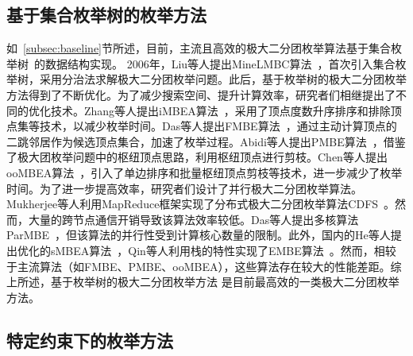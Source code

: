 

\subsection{基于集合枚举树的枚举方法}

如~\ref{subsec:baseline}节所述，目前，主流且高效的极大二分团枚举算法基于集合枚举树~\cite{SEtree92}的数据结构实现。
2006年，Liu等人提出MineLMBC算法~\cite{minel06}，首次引入集合枚举树，采用分治法求解极大二分团枚举问题。此后，基于枚举树的极大二分团枚举方法得到了不断优化。为了减少搜索空间、提升计算效率，研究者们相继提出了不同的优化技术。Zhang等人提出iMBEA算法~\cite{iMBEA14}，采用了顶点度数升序排序和排除顶点集等技术，以减少枚举时间。Das等人提出FMBE算法~\cite{parMBE19}，通过主动计算顶点的二跳邻居作为候选顶点集合，加速了枚举过程。Abidi等人提出PMBE算法~\cite{PMBE20}，借鉴了极大团枚举问题中的枢纽顶点思路，利用枢纽顶点进行剪枝。Chen等人提出ooMBEA算法~\cite{ooMBE22}，引入了单边排序和批量枢纽顶点剪枝等技术，进一步减少了枚举时间。为了进一步提高效率，研究者们设计了并行极大二分团枚举算法。Mukherjee等人利用MapReduce框架实现了分布式极大二分团枚举算法CDFS~\cite{mapreduceMBE16}。然而，大量的跨节点通信开销导致该算法效率较低。Das等人提出多核算法ParMBE~\cite{parMBE19}，但该算法的并行性受到计算核心数量的限制。此外，国内的He等人提出优化的sMBEA算法~\cite{MBEHe18,MBEchinese19}，Qin等人利用栈的特性实现了EMBE算法~\cite{MBEQin20}。然而，相较于主流算法（如FMBE、PMBE、ooMBEA），这些算法存在较大的性能差距。综上所述，基于枚举树的极大二分团枚举方法
是目前最高效的一类极大二分团枚举方法。

\subsection{特定约束下的枚举方法}

